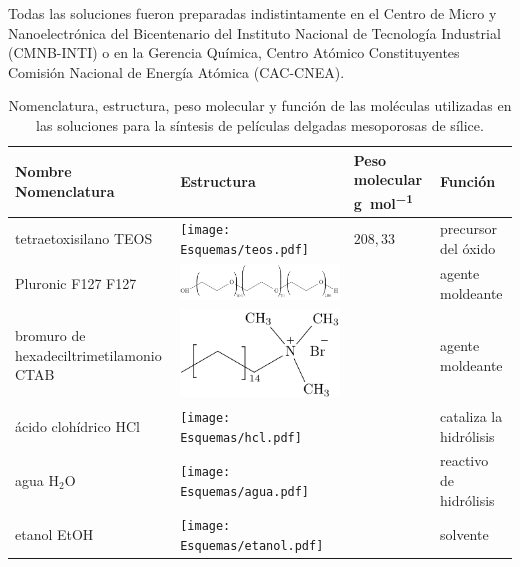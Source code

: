 		Todas las soluciones fueron preparadas indistintamente en el Centro de Micro y Nanoelectrónica del Bicentenario del Instituto Nacional de Tecnología Industrial (CMNB-INTI) o en la Gerencia Química, Centro Atómico Constituyentes Comisión Nacional de Energía Atómica (CAC-CNEA). 
				\begin{table}[ht] 
						  \caption[Reactivos para los soles]{Nomenclatura, estructura, peso molecular y función de las moléculas utilizadas en las soluciones para la síntesis de películas delgadas mesoporosas de sílice.} 
				  		  \begin{tabular}{>{\raggedright\arraybackslash}m{2.40cm}>{\centering\arraybackslash}m{4cm}>{\centering\arraybackslash}m{2.35cm}>{\raggedright\arraybackslash}m{1.7cm}} 
				  		  \toprule
						  Nombre Nomenclatura    & Estructura & Peso molecular \si{g.mol^{-1}} & Función\\ \midrule
				      	  tetraetoxisilano TEOS & \texttt{[image: Esquemas/teos.pdf]} & $208,33$ & precursor del óxido  \\ \midrule
				  		  Pluronic F127 F127    & \hspace*{-10px} \includegraphics[scale=0.5]{Esquemas/f127.pdf} & \multirow{1}{*}{$13800$}	 & agente moldeante	 \\ \midrule
				  		  bromuro de hexadeciltrimetilamonio  CTAB   & \hspace*{1cm} \includegraphics[scale=0.6]{Esquemas/ctab.pdf} & \multirow{1}{*}{$364.48$}	 & agente moldeante	 \\ \midrule
				  		  ácido clohídrico HCl& \texttt{[image: Esquemas/hcl.pdf]}  & \multirow{1}{*}{$36,46$}   & cataliza la hidrólisis \\ \midrule
				  		  agua \hspace{2cm} H$_2$O  &  \texttt{[image: Esquemas/agua.pdf]}  & \multirow{1}{*}{$18,02$}   & reactivo de hidrólisis \\ \midrule
				  		  etanol \hspace{2cm} EtOH  & \texttt{[image: Esquemas/etanol.pdf]}  & \multirow{1}{*}{$46,07$}   & solvente \\ 
				  		  \bottomrule
				    	  \end{tabular}
				   		  \label{tabla:reactivos}
				 \end{table}
		
